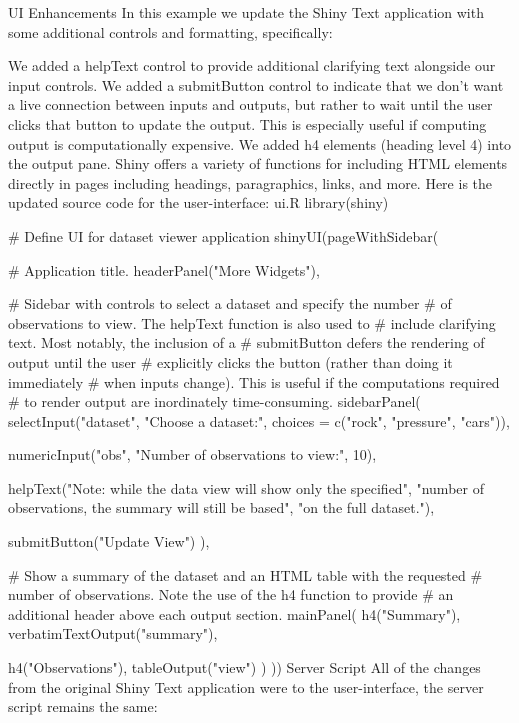 UI Enhancements
In this example we update the Shiny Text application with some additional controls and formatting, specifically:

We added a helpText control to provide additional clarifying text alongside our input controls.
We added a submitButton control to indicate that we don’t want a live connection between inputs and outputs, but rather to wait until the user clicks that button to update the output. This is especially useful if computing output is computationally expensive.
We added h4 elements (heading level 4) into the output pane. Shiny offers a variety of functions for including HTML elements directly in pages including headings, paragraphics, links, and more.
Here is the updated source code for the user-interface:
ui.R
library(shiny)

# Define UI for dataset viewer application
shinyUI(pageWithSidebar(

  # Application title.
  headerPanel("More Widgets"),

  # Sidebar with controls to select a dataset and specify the number
  # of observations to view. The helpText function is also used to 
  # include clarifying text. Most notably, the inclusion of a 
  # submitButton defers the rendering of output until the user 
  # explicitly clicks the button (rather than doing it immediately
  # when inputs change). This is useful if the computations required
  # to render output are inordinately time-consuming.
  sidebarPanel(
    selectInput("dataset", "Choose a dataset:", 
                choices = c("rock", "pressure", "cars")),

    numericInput("obs", "Number of observations to view:", 10),

    helpText("Note: while the data view will show only the specified",
             "number of observations, the summary will still be based",
             "on the full dataset."),

    submitButton("Update View")
  ),

  # Show a summary of the dataset and an HTML table with the requested
  # number of observations. Note the use of the h4 function to provide
  # an additional header above each output section.
  mainPanel(
    h4("Summary"),
    verbatimTextOutput("summary"),

    h4("Observations"),
    tableOutput("view")
  )
))
Server Script
All of the changes from the original Shiny Text application were to the user-interface, the server script remains the same:

